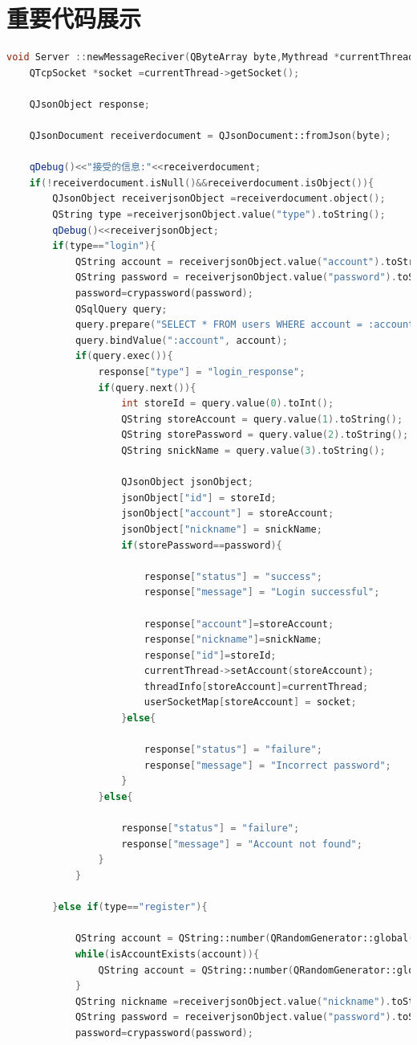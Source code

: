 \documentclass[UTF8]{ctexart}
\begin{document}
\section{重要代码展示}
\begin{lstlisting}[language=C++, caption=服务端接受信息并处理]
void Server ::newMessageReciver(QByteArray byte,Mythread *currentThread){
	QTcpSocket *socket =currentThread->getSocket();
	
	QJsonObject response;
	
	QJsonDocument receiverdocument = QJsonDocument::fromJson(byte);
	
	qDebug()<<"接受的信息:"<<receiverdocument;
	if(!receiverdocument.isNull()&&receiverdocument.isObject()){
		QJsonObject receiverjsonObject =receiverdocument.object();
		QString type =receiverjsonObject.value("type").toString();
		qDebug()<<receiverjsonObject;
		if(type=="login"){
			QString account = receiverjsonObject.value("account").toString();
			QString password = receiverjsonObject.value("password").toString();
			password=crypassword(password);
			QSqlQuery query;
			query.prepare("SELECT * FROM users WHERE account = :account");
			query.bindValue(":account", account);
			if(query.exec()){
				response["type"] = "login_response";
				if(query.next()){
					int storeId = query.value(0).toInt();
					QString storeAccount = query.value(1).toString();
					QString storePassword = query.value(2).toString();
					QString snickName = query.value(3).toString();
					
					QJsonObject jsonObject;
					jsonObject["id"] = storeId;
					jsonObject["account"] = storeAccount;
					jsonObject["nickname"] = snickName;
					if(storePassword==password){
						
						response["status"] = "success";
						response["message"] = "Login successful";
						
						response["account"]=storeAccount;
						response["nickname"]=snickName;
						response["id"]=storeId;
						currentThread->setAccount(storeAccount);
						threadInfo[storeAccount]=currentThread;
						userSocketMap[storeAccount] = socket;
					}else{
						
						response["status"] = "failure";
						response["message"] = "Incorrect password";
					}
				}else{
					
					response["status"] = "failure";
					response["message"] = "Account not found";
				}
			}
			
		}else if(type=="register"){
			
			QString account = QString::number(QRandomGenerator::global()->bounded(static_cast<double>(1000000000LL)) + 10000000, 'f', 0);
			while(isAccountExists(account)){
				QString account = QString::number(QRandomGenerator::global()->bounded(static_cast<double>(1000000000LL)) + 10000000, 'f', 0);
			}
			QString nickname =receiverjsonObject.value("nickname").toString();
			QString password = receiverjsonObject.value("password").toString();
			password=crypassword(password);
			

\end{lstlisting}
\end{document}
